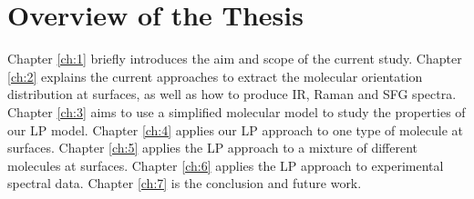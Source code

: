 \section{Overview of the Thesis}
Chapter \ref{ch:1} briefly introduces the aim and scope of the current study. Chapter \ref{ch:2} explains the current approaches to extract the molecular orientation distribution at surfaces, as well as how to produce IR, Raman and SFG spectra. Chapter \ref{ch:3} aims to use a simplified molecular model to study the properties of our LP model. Chapter \ref{ch:4} applies our LP approach to one type of molecule at surfaces. Chapter \ref{ch:5} applies the LP approach to a mixture of different molecules at surfaces. Chapter \ref{ch:6} applies the LP approach to experimental spectral data. Chapter \ref{ch:7} is the conclusion and future work.
